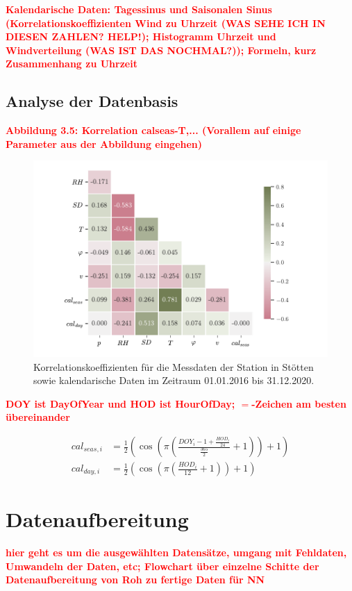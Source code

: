 \documentclass[
12pt, %
toc=listofnumbered, %
toc=chapterentrydotfill, %
numbers=noenddot, %
captions=tableheading, %
]{scrreprt}
\let\Oldsection\section
\renewcommand{\section}{\FloatBarrier\Oldsection}
\let\Oldsubsection\subsection
\renewcommand{\subsection}{\FloatBarrier\Oldsubsection}
\newcommand{\highlight}[1]{\textbf{\textcolor{red}{#1}}}
\begin{document}
\highlight{Kalendarische Daten: Tagessinus und Saisonalen Sinus (Korrelationskoeffizienten Wind zu Uhrzeit (WAS SEHE ICH IN DIESEN ZAHLEN? HELP!); Histogramm Uhrzeit und Windverteilung (WAS IST DAS NOCHMAL?)); 
Formeln, kurz Zusammenhang zu Uhrzeit}\\

\subsection{Analyse der Datenbasis}
\highlight{Abbildung 3.5: Korrelation calseas-T,... (Vorallem auf einige Parameter aus der Abbildung eingehen)}

\begin{figure}[tph]
	\begin{center}
		\includegraphics[]{./images/corr.pdf}
		\caption{Korrelationskoeffizienten für die Messdaten der Station in Stötten sowie kalendarische Daten im Zeitraum 01.01.2016 bis 31.12.2020.}
		\label{fig:corr}
	\end{center}
\end{figure}

\highlight{DOY ist DayOfYear und HOD ist HourOfDay; $=$-Zeichen am besten übereinander}

\begin{align}
	cal_{seas,i} &= \frac{1}{2}(\cos(\pi (\frac{DOY_i -1 + \frac{HOD_i}{24}}{\frac{365}{2}}+ 1)) + 1)\label{eq:cal_seas}\\
	cal_{day,i} &= \frac{1}{2}(\cos(\pi (\frac{HOD_i}{12}+ 1)) + 1)\label{eq:cal_day}
\end{align}

\section{Datenaufbereitung}
\highlight{hier geht es um die ausgewählten Datensätze, umgang mit Fehldaten, 
Umwandeln der Daten, etc;  
Flowchart über einzelne Schitte der Datenaufbereitung von Roh zu fertige Daten für NN}
\end{document}
